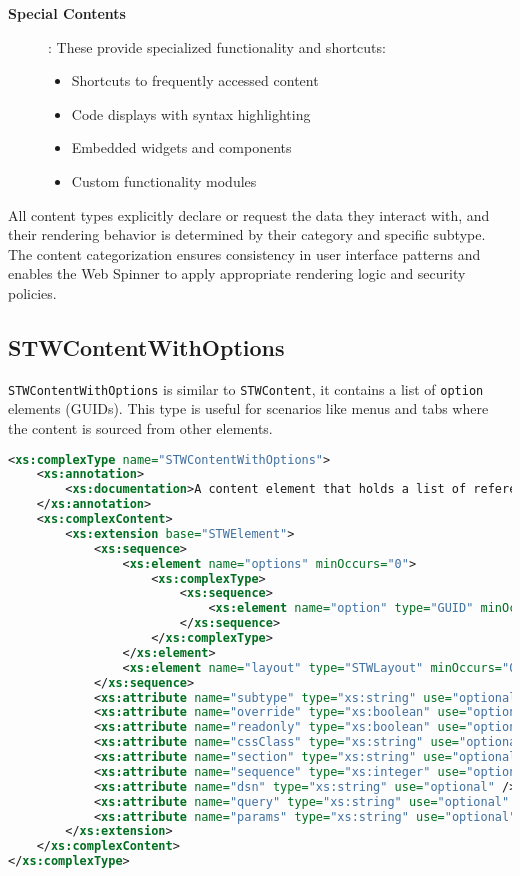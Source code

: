 \begin{description}
\item[\textbf{Special Contents}]: These provide specialized functionality and shortcuts:
\begin{itemize}
\item Shortcuts to frequently accessed content
\item Code displays with syntax highlighting
\item Embedded widgets and components
\item Custom functionality modules
\end{itemize}
\end{description}

All content types explicitly declare or request the data they interact with, and their rendering behavior is determined by their category and specific subtype. The content categorization ensures consistency in user interface patterns and enables the Web Spinner to apply appropriate rendering logic and security policies.

\subsection{STWContentWithOptions}

\texttt{STWContentWithOptions} is similar to \texttt{STWContent}, it contains a list of \texttt{option} elements (GUIDs). This type is useful for scenarios like menus and tabs where the content is sourced from other elements.

\begin{lstlisting}[language=XML,caption={STWContentWithOptions Type Definition}]
<xs:complexType name="STWContentWithOptions">
    <xs:annotation>
        <xs:documentation>A content element that holds a list of references (options) to other STWElements, instead of nested child elements. Useful for menus and tabs where content is sourced from elsewhere.</xs:documentation>
    </xs:annotation>
    <xs:complexContent>
        <xs:extension base="STWElement">
            <xs:sequence>
                <xs:element name="options" minOccurs="0">
                    <xs:complexType>
                        <xs:sequence>
                            <xs:element name="option" type="GUID" minOccurs="0" maxOccurs="unbounded" />
                        </xs:sequence>
                    </xs:complexType>
                </xs:element>
                <xs:element name="layout" type="STWLayout" minOccurs="0" />
            </xs:sequence>
            <xs:attribute name="subtype" type="xs:string" use="optional" />
            <xs:attribute name="override" type="xs:boolean" use="optional" />
            <xs:attribute name="readonly" type="xs:boolean" use="optional" />
            <xs:attribute name="cssClass" type="xs:string" use="optional" />
            <xs:attribute name="section" type="xs:string" use="optional" />
            <xs:attribute name="sequence" type="xs:integer" use="optional" />
            <xs:attribute name="dsn" type="xs:string" use="optional" />
            <xs:attribute name="query" type="xs:string" use="optional" />
            <xs:attribute name="params" type="xs:string" use="optional" />
        </xs:extension>
    </xs:complexContent>
</xs:complexType>
\end{lstlisting}

